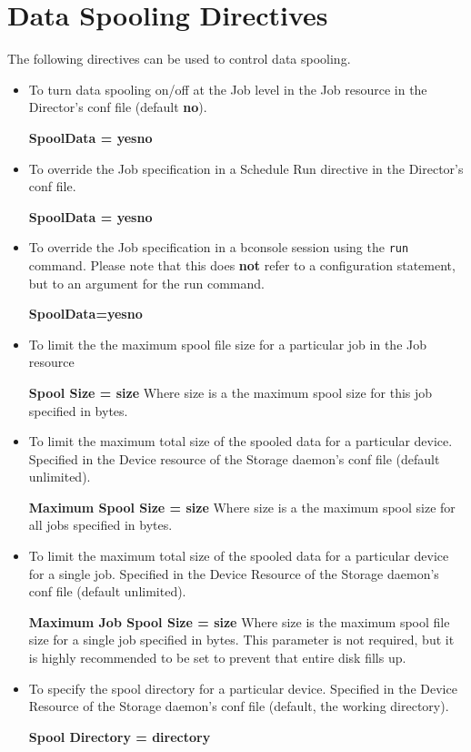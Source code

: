 \label{directives}
\section{Data Spooling Directives}

The following directives can be used to control data spooling.

\begin{itemize}
\item To turn data spooling on/off at the Job level in  the Job resource in
   the Director's conf file (default  {\bf no}).

{\bf SpoolData = yes{\textbar}no}

\item To override the Job specification in a Schedule Run  directive in the
   Director's conf file.

{\bf SpoolData = yes{\textbar}no}

\item To override the Job specification in a bconsole session using the \texttt{run}
   command. Please note that this does {\bf not } refer to a configuration
   statement, but to an argument for the run command.

{\bf SpoolData=yes{\textbar}no}

\item To limit the the maximum spool file size for a particular job in the Job
  resource

{\bf Spool Size = size}
   Where size is a the maximum spool size for this job  specified in bytes.

\item To limit the maximum total size of the spooled data  for a particular
   device. Specified in the Device  resource of the Storage daemon's conf file
   (default  unlimited).

{\bf Maximum Spool Size = size}
   Where size is a the maximum spool size for all jobs  specified in bytes.

\item To limit the maximum total size of the spooled data  for a particular
   device for a single job. Specified  in the Device Resource of the Storage
   daemon's conf  file (default unlimited).

{\bf Maximum Job Spool Size = size}
   Where size is the maximum spool file size for a single  job specified in
   bytes. This parameter is not required, but it is highly recommended to be set to prevent that entire disk fills up.

\item To specify the spool directory for a particular device.  Specified in
   the Device Resource of the Storage daemon's conf  file (default, the working
   directory).

{\bf Spool Directory = directory}
\end{itemize}

